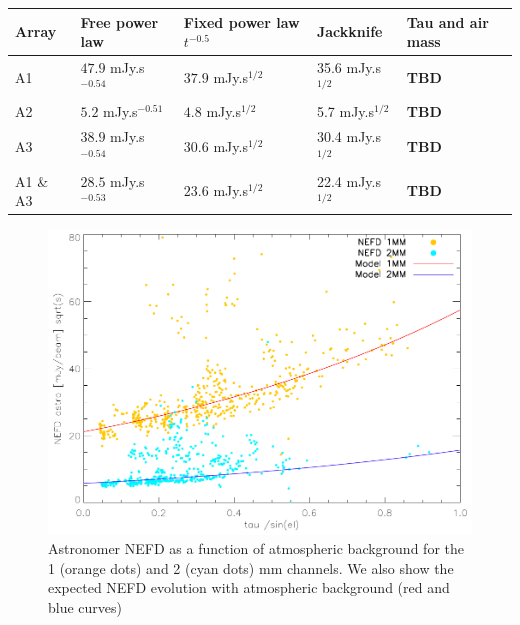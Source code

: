 \documentclass[a4paper, 11pt]{article} %
\begin{document}
\begin{table}
\begin{tabular}{|l|l|l|l|l|}
\hline
Array & Free power law & Fixed power law $t^{-0.5}$ & Jackknife & Tau and air mass\\
\hline
A1       & $47.9$ mJy.s$^{-0.54}$ & $37.9$ mJy.s$^{1/2}$ & 35.6 mJy.s$^{1/2}$ & {\bf TBD}\\
A2       & $5.2$  mJy.s$^{-0.51}$ & $4.8$  mJy.s$^{1/2}$ & 5.7  mJy.s$^{1/2}$ & {\bf TBD}\\
A3       & $38.9$ mJy.s$^{-0.54}$ & $30.6$ mJy.s$^{1/2}$ & 30.4 mJy.s$^{1/2}$ & {\bf TBD}\\
A1 \& A3 & $28.5$ mJy.s$^{-0.53}$ & $23.6$ mJy.s$^{1/2}$ & 22.4 mJy.s$^{1/2}$ & {\bf TBD}\\
\hline
\end{tabular}
\label{tab:nefd}
\end{table}


\begin{figure}
\begin{center}
\includegraphics[clip, angle=0, scale =0.8]{Figures/NEFDIndScans/nefd_tau_run22.pdf}
\caption{Astronomer NEFD as a function of atmospheric background for the 1 (orange dots) and 2 (cyan dots) mm channels. We also show the expected NEFD evolution with atmospheric background (red and blue curves)}
\label{fig:nefdvsbackground}
\end{center}
\end{figure}
\end{document}
